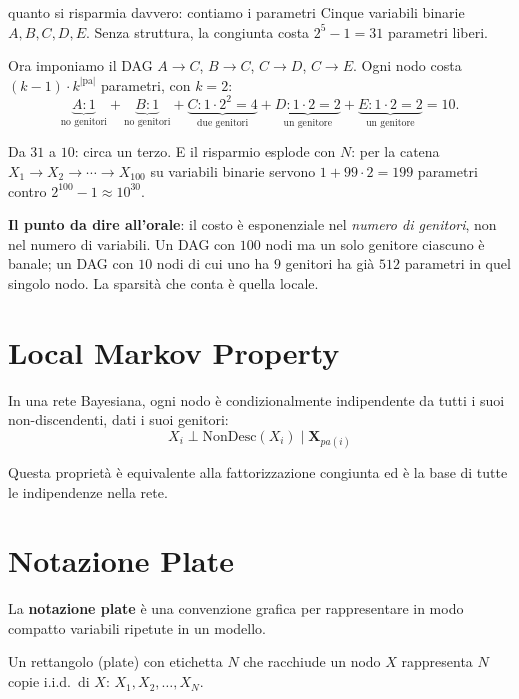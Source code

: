 \begin{esempiosvolto}{quanto si risparmia davvero: contiamo i parametri}
Cinque variabili binarie $A, B, C, D, E$. Senza struttura, la congiunta costa $2^5 - 1 = 31$ parametri liberi.

Ora imponiamo il DAG $A \to C$, $B \to C$, $C \to D$, $C \to E$. Ogni nodo costa $(k-1) \cdot k^{|\text{pa}|}$ parametri, con $k=2$:
\[
\underbrace{A: 1}_{\text{no genitori}} + \underbrace{B: 1}_{\text{no genitori}} + \underbrace{C: 1 \cdot 2^2 = 4}_{\text{due genitori}} + \underbrace{D: 1 \cdot 2 = 2}_{\text{un genitore}} + \underbrace{E: 1 \cdot 2 = 2}_{\text{un genitore}} = 10.
\]

Da $31$ a $10$: circa un terzo. E il risparmio esplode con $N$: per la catena $X_1 \to X_2 \to \cdots \to X_{100}$ su variabili binarie servono $1 + 99 \cdot 2 = 199$ parametri contro $2^{100} - 1 \approx 10^{30}$.

\textbf{Il punto da dire all'orale}: il costo è esponenziale nel \emph{numero di genitori}, non nel numero di variabili. Un DAG con $100$ nodi ma un solo genitore ciascuno è banale; un DAG con $10$ nodi di cui uno ha $9$ genitori ha già $512$ parametri in quel singolo nodo. La sparsità che conta è quella locale.
\end{esempiosvolto}

\section{Local Markov Property}

\begin{theorem}
In una rete Bayesiana, ogni nodo è condizionalmente indipendente da tutti i suoi non-discendenti, dati i suoi genitori:
\[
X_i \perp \text{NonDesc}(X_i) \mid \mathbf{X}_{pa(i)}
\]
\end{theorem}

Questa proprietà è equivalente alla fattorizzazione congiunta ed è la base di tutte le indipendenze nella rete.

\section{Notazione Plate}

La \textbf{notazione plate} è una convenzione grafica per rappresentare in modo compatto variabili ripetute in un modello.

Un rettangolo (plate) con etichetta $N$ che racchiude un nodo $X$ rappresenta $N$ copie i.i.d.\ di $X$: $X_1, X_2, \ldots, X_N$.

